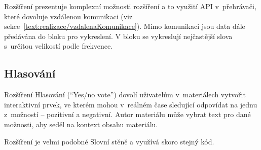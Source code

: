 Rozšíření prezentuje komplexní možnosti rozšíření a to využití API v~přehrávači, které dovoluje vzdálenou komunikaci (viz sekce~\ref{text:realizace/vzdalenaKomunikace}).
Mimo komunikaci jsou data dále předávána do bloku pro vykreslení.
V bloku se vykreslují nejčastější slova s~určitou velikostí podle frekvence.


\subsection{Hlasování}

Rozšíření Hlasování (\enquote{Yes/no vote}) dovolí uživatelům v~materiálech vytvořit interaktivní prvek, ve kterém mohou v~reálném čase sledující odpovídat na jednu z~možností -- pozitivní a negativní.
Autor materiálu může vybrat text pro dané možnosti, aby seděl na kontext obsahu materiálu.

Rozšíření je velmi podobné Slovní stěně a využívá skoro stejný kód.